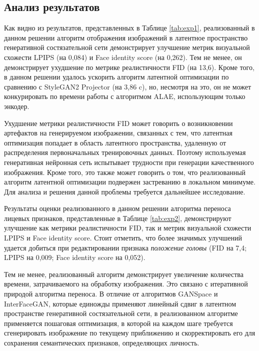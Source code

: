 \subsection{Анализ результатов}

Как видно из результатов, представленных в Таблице \ref{tab:exp1}, реализованный в данном решении алгоритм отображения изображений в латентное пространство генеративной состязательной сети демонстрирует улучшение метрик визуальной схожести LPIPS (на 0,084) и Face identity score (на 0,262).
Тем не менее, он демонстрирует ухудшение по метрике реалистичности FID (на 13,6).
Кроме того, в данном решении удалось ускорить алгоритм латентной оптимизации по сравнению с StyleGAN2 Projector (на 3,86 c), но, несмотря на это, он не может конкурировать по времени работы с алгоритмом ALAE, использующим только энкодер.

Ухудшение метрики реалистичности FID может говорить о возникновении артефактов на генерируемом изображении, связанных с тем, что латентная оптимизация попадает в область латентного пространства, удаленную от распределения первоначальных тренировочных данных.
Поэтому используемая генеративная нейронная сеть испытывает трудности при генерации качественного изображения.
Кроме того, это также может говорить о том, что реализованный алгоритм латентной оптимизации подвержен застреванию в локальном минимуме. Для анализа и решения данной проблемы требуется дальнейшее исследование.

Результаты оценки реализованного в данном решении алгоритма переноса лицевых признаков, представленные в Таблице \ref{tab:exp2}, демонстрируют улучшение как метрики реалистичности FID, так и метрик визуальной схожести LPIPS и Face identity score.
Стоит отметить, что более значимых улучшений удается добиться при редактировании признака \emph{положение головы} (FID на 7,4; LPIPS на 0,009; Face identity score на 0,052).

Тем не менее, реализованный алгоритм демонстрирует увеличение количества времени, затрачиваемого на обработку изображения.
Это связано с итеративной природой алгоритма переноса.
В отличие от алгоритмов GANSpace и InterFaceGAN, которые единожды применяют линейный сдвиг в латентном пространстве генеративной состязательной сети, в реализованном алгоритме применяется пошаговая оптимизация, в которой на каждом шаге требуется сгенерировать изображение по текущему приближению и скорректировать его для сохранения семантических признаков, определяющих личность.